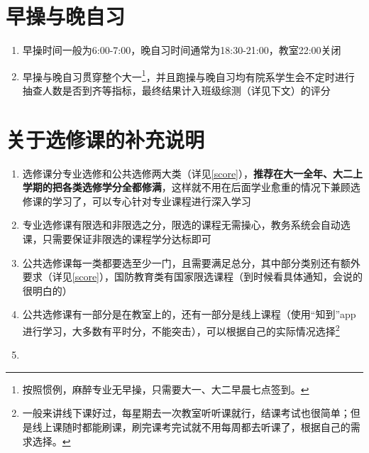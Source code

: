 \section[早操与晚自习]{早操与晚自习}
\begin{enumerate}
    \item 早操时间一般为6:00-7:00，晚自习时间通常为18:30-21:00，教室22:00关闭
    \item 早操与晚自习贯穿整个大一\footnote{按照惯例，麻醉专业无早操，只需要大一、大二早晨七点签到。}，并且跑操与晚自习均有院系学生会不定时进行抽查人数是否到齐等指标，最终结果计入班级综测（详见下文）的评分
\end{enumerate}

\section[关于选修课的补充说明]{关于选修课的补充说明}
\begin{enumerate}
    \item 选修课分专业选修和公共选修两大类（详见\uline{\ref{score}}），\textbf{推荐在大一全年、大二上学期的把各类选修学分全都修满}，这样就不用在后面学业愈重的情况下兼顾选修课的学习了，可以专心针对专业课程进行深入学习
    \item 专业选修课有限选和非限选之分，限选的课程无需操心，教务系统会自动选课，只需要保证非限选的课程学分达标即可
    \item 公共选修课每一类都要选至少一门，且需要满足总分，其中部分类别还有额外要求（详见\uline{\ref{score}}），国防教育类有国家限选课程（到时候看具体通知，会说的很明白的）
    \item 公共选修课有一部分是在教室上的，还有一部分是线上课程（使用“知到”app进行学习，大多数有平时分，不能突击），可以根据自己的实际情况选择\footnote{一般来讲线下课好过，每星期去一次教室听听课就行，结课考试也很简单；但是线上课随时都能刷课，刷完课考完试就不用每周都去听课了，根据自己的需求选择。}
    \item \textbf{}
\end{enumerate}

